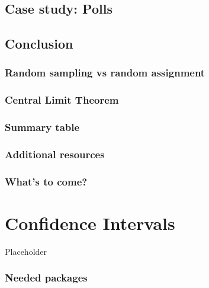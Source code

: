 \documentclass[
  12pt, krantz2,
]{krantz}
\begin{document}
\hypertarget{sampling-case-study}{%
\section{Case study: Polls}\label{sampling-case-study}}

\hypertarget{sampling-conclusion}{%
\section{Conclusion}\label{sampling-conclusion}}

\hypertarget{sampling-conclusion-sampling-vs-assignment}{%
\subsection{Random sampling vs random assignment}\label{sampling-conclusion-sampling-vs-assignment}}

\hypertarget{sampling-conclusion-central-limit-theorem}{%
\subsection{Central Limit Theorem}\label{sampling-conclusion-central-limit-theorem}}

\hypertarget{sampling-conclusion-table}{%
\subsection{Summary table}\label{sampling-conclusion-table}}

\hypertarget{additional-resources-5}{%
\subsection{Additional resources}\label{additional-resources-5}}

\hypertarget{whats-to-come-6}{%
\subsection{What's to come?}\label{whats-to-come-6}}

\hypertarget{confidence-intervals}{%
\chapter{Confidence Intervals}\label{confidence-intervals}}

Placeholder

\hypertarget{needed-packages-6}{%
\subsection*{Needed packages}\label{needed-packages-6}}
\end{document}
